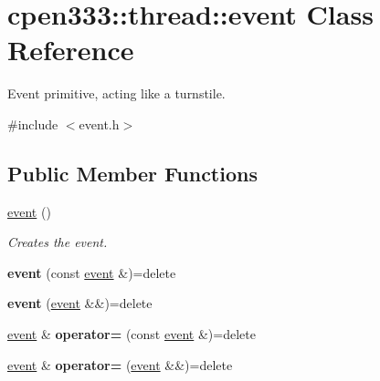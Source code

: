 \hypertarget{classcpen333_1_1thread_1_1event}{}\section{cpen333\+:\+:thread\+:\+:event Class Reference}
\label{classcpen333_1_1thread_1_1event}


Event primitive, acting like a turnstile.  




{\ttfamily \#include $<$event.\+h$>$}

\subsection*{Public Member Functions}
\begin{DoxyCompactItemize}
\item 
\mbox{\label{classcpen333_1_1thread_1_1event_a22e507616a649d1b0cfd534c495d3715}} 
\hyperlink{classcpen333_1_1thread_1_1event_a22e507616a649d1b0cfd534c495d3715}{event} ()
\begin{DoxyCompactList}\small\item\em Creates the event. \end{DoxyCompactList}\item 
\mbox{\label{classcpen333_1_1thread_1_1event_ae3fa010e620c5ff4d839d38f06f3baa3}} 
{\bfseries event} (const \hyperlink{classcpen333_1_1thread_1_1event}{event} \&)=delete
\item 
\mbox{\label{classcpen333_1_1thread_1_1event_a02c9a05685af5ee510e025cb5ceee71a}} 
{\bfseries event} (\hyperlink{classcpen333_1_1thread_1_1event}{event} \&\&)=delete
\item 
\mbox{\label{classcpen333_1_1thread_1_1event_a9808627c07cfa2a256c5e6b5c4f18254}} 
\hyperlink{classcpen333_1_1thread_1_1event}{event} \& {\bfseries operator=} (const \hyperlink{classcpen333_1_1thread_1_1event}{event} \&)=delete
\item 
\mbox{\label{classcpen333_1_1thread_1_1event_ac21906f7dff32060a58ed881916663a6}} 
\hyperlink{classcpen333_1_1thread_1_1event}{event} \& {\bfseries operator=} (\hyperlink{classcpen333_1_1thread_1_1event}{event} \&\&)=delete

\end{DoxyCompactItemize}
